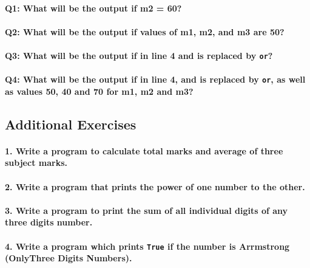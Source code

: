 \documentclass{article}
\begin{document}
\paragraph{\textbf{Q1:} What will be the output if m2 = 60?}
\paragraph{\textbf{Q2:} What will be the output if values of m1, m2, and m3 are 50?}
\paragraph{\textbf{Q3:} What will be the output if in line 4 and is replaced by \texttt{or}?}
\paragraph{\textbf{Q4:} What will be the output if in line 4, and is replaced by \texttt{or}, as well as values 50, 40 and 70 for m1, m2 and m3?}

\subsection{Additional Exercises}
\paragraph{1. Write a program to calculate total marks and average of three subject marks.}
\paragraph{2. Write a program that prints the power of one number to the other.}
\paragraph{3. Write a program to print the sum of all individual digits of any three digits number.}
\paragraph{4. Write a program which prints \texttt{True} if the number is Arrmstrong (OnlyThree Digits Numbers).}
\end{document}
